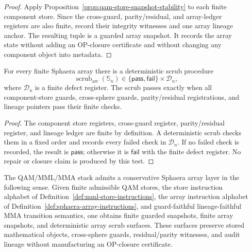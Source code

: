 \begin{proof}
Apply Proposition~\ref{prop:qam-store-snapshot-stability} to each finite component store. Since the cross-guard, parity/residual, and array-ledger registers are also finite, record their integrity witnesses and one array lineage anchor. The resulting tuple is a guarded array snapshot. It records the array state without adding an OP-closure certificate and without changing any component object into metadata.
\end{proof}

\begin{proposition}\label{prop:sphaera-array-scrub}
For every finite Sphaera array there is a deterministic scrub procedure
\[
 \operatorname{scrub}_{\mathrm{arr}}(\mathbb S_n)
 \in
 \{\mathsf{pass},\mathsf{fail}\}\times\mathcal D_n,
\]
where \(\mathcal D_n\) is a finite defect register. The scrub passes exactly when all component-store guards, cross-sphere guards, parity/residual registrations, and lineage pointers pass their finite checks.
\end{proposition}

\begin{proof}
The component store registers, cross-guard register, parity/residual register, and lineage ledger are finite by definition. A deterministic scrub checks them in a fixed order and records every failed check in \(\mathcal D_n\). If no failed check is recorded, the result is \(\mathsf{pass}\); otherwise it is \(\mathsf{fail}\) with the finite defect register. No repair or closure claim is produced by this test.
\end{proof}

\begin{theorem}\label{thm:qam-mml-mma-sphaera-array-layer}
The QAM/MML/MMA stack admits a conservative Sphaera array layer in the following sense. Given finite admissible QAM stores, the store instruction alphabet of Definition~\ref{def:mml-store-instructions}, the array instruction alphabet of Definition~\ref{def:sphaera-array-instructions}, and guard-faithful lineage-faithful MMA transition semantics, one obtains finite guarded snapshots, finite array snapshots, and deterministic array scrub surfaces. These surfaces preserve stored mathematical objects, cross-sphere guards, residual/parity witnesses, and audit lineage without manufacturing an OP-closure certificate.
\end{theorem}

